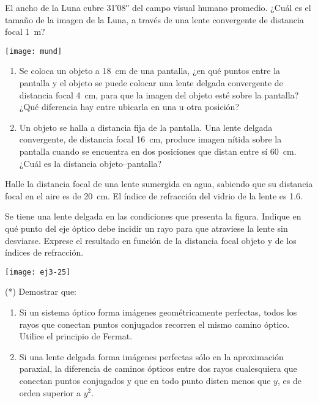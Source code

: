 \item 
\begin{minipage}[t][2cm]{0.55\textwidth}
El ancho de la Luna cubre \ang{;31;08} del campo visual humano promedio.
¿Cuál es el tamaño de la imagen de la Luna, a través de una lente convergente de distancia focal \SI{1}{\metre}?
\end{minipage}
\begin{minipage}[c][1cm][t]{0.4\textwidth}
	\texttt{[image: mund]}
\end{minipage}



\item
\begin{enumerate}
	\item Se coloca un objeto a \SI{18}{\centi\metre} de una pantalla, ¿en qué puntos entre la pantalla y el objeto se puede colocar una lente delgada convergente de distancia focal \SI{4}{\centi\metre}, para que la imagen del objeto esté sobre la pantalla? ¿Qué diferencia hay entre ubicarla en una u otra posición?
	\item Un objeto se halla a distancia fija de la pantalla. Una lente delgada convergente, de distancia focal \SI{16}{\centi\metre}, produce imagen nítida sobre la pantalla cuando se encuentra en dos posiciones que distan entre sí \SI{60}{\centi\metre}.
¿Cuál es la distancia objeto--pantalla?
\end{enumerate}



\item Halle la distancia focal de una lente sumergida en agua, sabiendo que su distancia focal en el aire es de \SI{20}{\centi\metre}.
El índice de refracción del vidrio de la lente es \num{1.6}. 



\item
\begin{minipage}[t][2cm]{0.65\textwidth}
Se tiene una lente delgada en las condiciones que presenta la figura.
Indique en qué punto del eje óptico debe incidir un rayo para que atraviese la lente sin desviarse.
Exprese el resultado en función de la distancia focal objeto y de los índices de refracción.
\end{minipage}
\begin{minipage}[c][0.4cm][t]{0.3\textwidth}
	\texttt{[image: ej3-25]}
\end{minipage}


\item (*) Demostrar que:
\begin{enumerate}
	\item Si un sistema óptico forma imágenes geométricamente perfectas, todos los rayos que conectan puntos conjugados recorren el mismo camino óptico.
	Utilice el principio de Fermat.
	\item Si una lente delgada forma imágenes perfectas sólo en la aproximación paraxial, la diferencia de caminos ópticos entre dos rayos cualesquiera que conectan puntos conjugados y que en todo punto disten menos que $y$, es de orden superior a $y^2$.
\end{enumerate}


